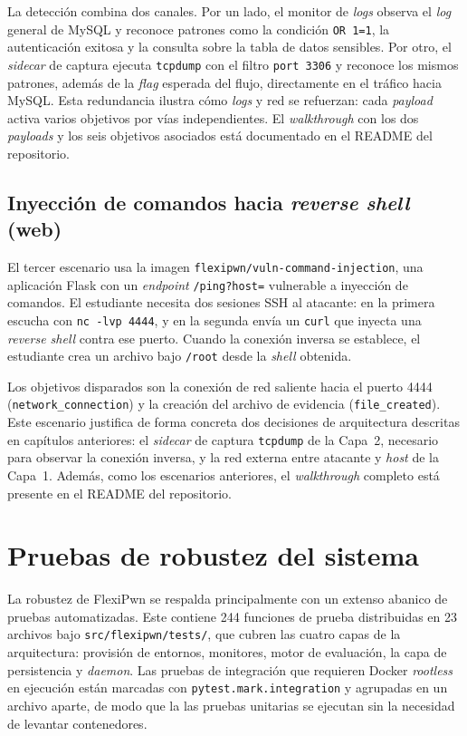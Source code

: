 La detección combina dos canales. Por un lado, el monitor de \textit{logs}
observa el \textit{log} general de MySQL y reconoce patrones como la condición
\texttt{OR 1=1}, la autenticación exitosa y la consulta sobre la tabla de datos
sensibles. Por otro, el \textit{sidecar} de captura ejecuta
\texttt{tcpdump} con el filtro
\texttt{port 3306} y reconoce los mismos patrones, además de la \textit{flag}
esperada del flujo, directamente en el tráfico hacia MySQL. Esta redundancia
ilustra cómo \textit{logs} y red se refuerzan: cada \textit{payload} activa
varios objetivos por vías independientes. El \textit{walkthrough} con los dos
\textit{payloads} y los seis objetivos asociados está documentado en el README
del repositorio.

\subsection{Inyección de comandos hacia \textit{reverse shell} (web)}

El tercer escenario usa la imagen \texttt{flexipwn/vuln-command-injection}, una
aplicación Flask con un \textit{endpoint} \texttt{/ping?host=} vulnerable a
inyección de comandos. El estudiante necesita dos sesiones SSH al atacante: en
la primera escucha con \texttt{nc -lvp 4444}, y en la segunda envía un
\texttt{curl} que inyecta una \textit{reverse shell} contra ese puerto. Cuando
la conexión inversa se establece, el estudiante crea un archivo bajo
\texttt{/root} desde la \textit{shell} obtenida.

\begin{sloppypar}
Los objetivos disparados son la conexión de red saliente hacia el puerto 4444
(\texttt{network\_connection}) y la creación del archivo de evidencia
(\texttt{file\_created}). Este escenario justifica de forma concreta dos
decisiones de arquitectura descritas en capítulos anteriores:
el \textit{sidecar}
de captura \texttt{tcpdump} de la Capa~2, necesario para observar la conexión
inversa, y
la red externa entre atacante y \textit{host} de la Capa~1. Además, como los
escenarios anteriores, el \textit{walkthrough} completo está presente en el
README del repositorio.
\end{sloppypar}

\section{Pruebas de robustez del sistema}

\begin{sloppypar}
La robustez de FlexiPwn se respalda principalmente con un extenso abanico de
pruebas automatizadas. Este contiene 244 funciones de prueba distribuidas en 23
archivos bajo \texttt{src/flexipwn/tests/}, que cubren las cuatro capas de la
arquitectura: provisión de entornos, monitores, motor de evaluación, la capa de
persistencia y \textit{daemon}. Las pruebas de integración que requieren Docker
\textit{rootless} en ejecución están marcadas con
\texttt{pytest.mark.integration}
y agrupadas en un archivo aparte, de modo que la las pruebas unitarias se
ejecutan sin la necesidad de levantar contenedores.
\end{sloppypar}

